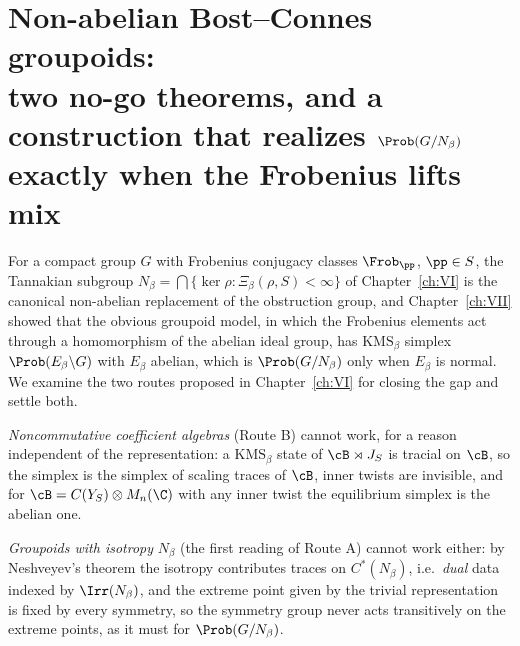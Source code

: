 \chapter[Non-abelian Bost--Connes groupoids]{Non-abelian Bost--Connes groupoids:\\ two no-go theorems, and a construction that realizes $\Prob(G/N_\beta)$\\ exactly when the Frobenius lifts mix}\label{ch:XXVII}
\begin{summary}
For a compact group $G$ with Frobenius conjugacy classes $\Frob_\pp$, $\pp\in S$, the Tannakian
subgroup $N_\beta=\bigcap\{\ker\rho:\Xi_\beta(\rho,S)<\infty\}$ of Chapter~\ref{ch:VI} is the canonical
non-abelian replacement of the obstruction group, and Chapter~\ref{ch:VII} showed that the obvious
groupoid model, in which the Frobenius elements act through a homomorphism of the abelian
ideal group, has $\mathrm{KMS}_\beta$ simplex $\Prob(E_\beta\backslash G)$ with $E_\beta$
abelian, which is $\Prob(G/N_\beta)$ only when $E_\beta$ is normal. We examine the two routes
proposed in Chapter~\ref{ch:VI} for closing the gap and settle both.

\emph{Noncommutative coefficient algebras} (Route B) cannot work, for a reason independent of
the representation: a $\mathrm{KMS}_\beta$ state of $\cB\rtimes J_S$ is tracial on $\cB$, so the
simplex is the simplex of scaling traces of $\cB$, inner twists are invisible, and for
$\cB=C(Y_S)\otimes M_n(\C)$ with any inner twist the equilibrium simplex is the abelian one.

\emph{Groupoids with isotropy} $N_\beta$ (the first reading of Route A) cannot work either:
by Neshveyev's theorem the isotropy contributes traces on $C^*(N_\beta)$, i.e.\ \emph{dual}
data indexed by $\Irr(N_\beta)$, and the extreme point given by the trivial representation
is fixed by every symmetry, so the symmetry group never acts transitively on the extreme
points, as it must for $\Prob(G/N_\beta)$.


\end{summary}
